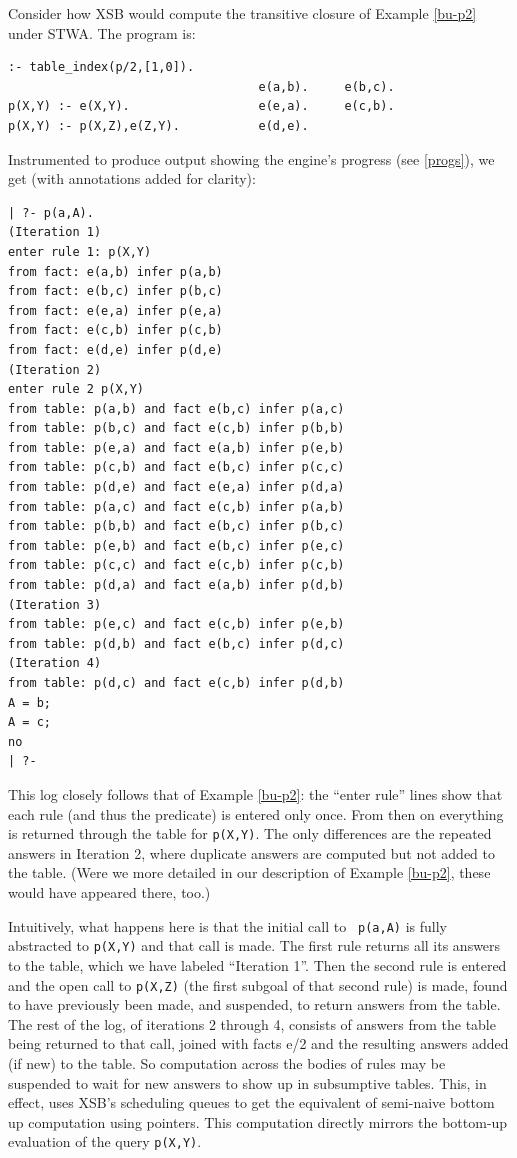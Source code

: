 \begin{example}
Consider how XSB would compute the transitive closure of Example
\ref{bu-p2} under STWA.  The program is:

\footnotesize
\begin{verbatim}
:- table_index(p/2,[1,0]).
                                   e(a,b).     e(b,c).
p(X,Y) :- e(X,Y).                  e(e,a).     e(c,b).
p(X,Y) :- p(X,Z),e(Z,Y).           e(d,e).
\end{verbatim}
\normalsize
Instrumented to produce output showing the engine's progress (see
\ref{progs}), we get (with annotations added for clarity):
\footnotesize
\begin{verbatim}
| ?- p(a,A).
(Iteration 1)
enter rule 1: p(X,Y) 
from fact: e(a,b) infer p(a,b)
from fact: e(b,c) infer p(b,c)
from fact: e(e,a) infer p(e,a)
from fact: e(c,b) infer p(c,b)
from fact: e(d,e) infer p(d,e)
(Iteration 2)
enter rule 2 p(X,Y) 
from table: p(a,b) and fact e(b,c) infer p(a,c)
from table: p(b,c) and fact e(c,b) infer p(b,b)
from table: p(e,a) and fact e(a,b) infer p(e,b)
from table: p(c,b) and fact e(b,c) infer p(c,c)
from table: p(d,e) and fact e(e,a) infer p(d,a)
from table: p(a,c) and fact e(c,b) infer p(a,b)
from table: p(b,b) and fact e(b,c) infer p(b,c)
from table: p(e,b) and fact e(b,c) infer p(e,c)
from table: p(c,c) and fact e(c,b) infer p(c,b)
from table: p(d,a) and fact e(a,b) infer p(d,b)
(Iteration 3)
from table: p(e,c) and fact e(c,b) infer p(e,b)
from table: p(d,b) and fact e(b,c) infer p(d,c)
(Iteration 4)
from table: p(d,c) and fact e(c,b) infer p(d,b)
A = b;
A = c;
no
| ?- 
\end{verbatim}
\normalsize
This log closely follows that of Example \ref{bu-p2}: the ``enter
rule'' lines show that each rule (and thus the predicate) is
entered only once.  From then on everything is returned through the
table for {\tt p(X,Y)}.  The only differences are the repeated answers
in Iteration 2, where duplicate answers are computed but not added to
the table.  (Were we more detailed in our description of Example
\ref{bu-p2}, these would have appeared there, too.)
\end{example}

Intuitively, what happens here is that the initial call to {\tt
  p(a,A)} is fully abstracted to {\tt p(X,Y)} and that call is made.
The first rule returns all its answers to the table, which we have
labeled ``Iteration 1''.  Then the second rule is entered and the open
call to {\tt p(X,Z)} (the first subgoal of that second rule) is made,
found to have previously been made, and suspended, to return answers
from the table. The rest of the log, of iterations 2 through 4,
consists of answers from the table being returned to that call, joined
with facts e/2 and the resulting answers added (if new) to the table.
So computation across the bodies of rules may be suspended to wait for
new answers to show up in subsumptive tables.  This, in effect, uses
XSB's scheduling queues to get the equivalent of semi-naive bottom up
computation using pointers.  This computation directly mirrors the
bottom-up evaluation of the query {\tt p(X,Y)}.

